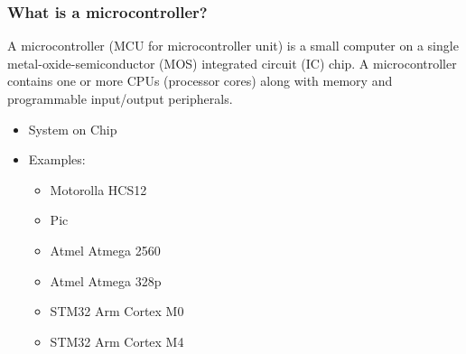 \documentclass[fleqn]{beamer} %
\newcommand{\sectiontitleI}{What is a microcontroller?} %
\begin{document}
	\begin{frame}[label=sectionI,containsverbatim] \small
		\frametitle{\sectiontitleI}
	
		A microcontroller (MCU for microcontroller unit) is a small computer on a single metal-oxide-semiconductor (MOS) integrated circuit (IC) chip. A microcontroller contains one or more CPUs (processor cores) along with memory and programmable input/output peripherals.
	
		\begin{itemize}
			
			\item System on Chip
			
			\item Examples: 
			
			\begin{multicols}{2}
			\begin{itemize}
				
				\item Motorolla HCS12
				\item Pic
				\item Atmel Atmega 2560
				\item Atmel Atmega 328p
				\item STM32 Arm Cortex M0
				\item STM32 Arm Cortex M4
			\end{itemize}
			

\end{multicols}
\end{itemize}
\end{frame}
\end{document}
